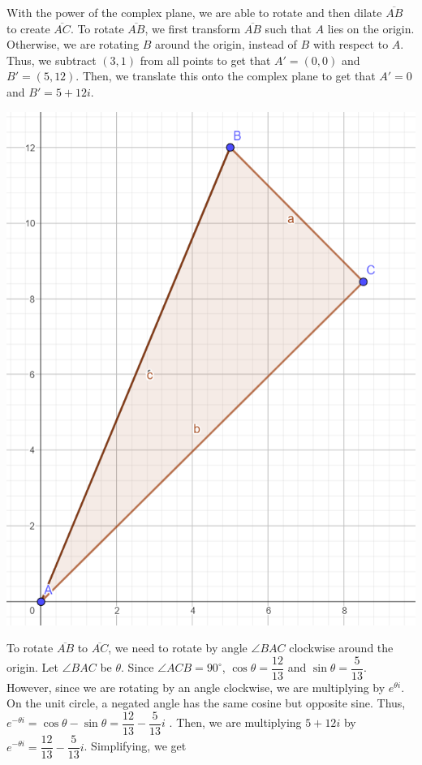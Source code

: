 \documentclass{article}
\begin{document}
With the power of the complex plane, we are able to rotate and then dilate $\overline{AB}$ to create $\overline{AC}$. To rotate $\overline{AB}$, we first transform $\overline{AB}$ such that $A$ lies on the origin. Otherwise, we are rotating $B$ around the origin, instead of $B$ with respect to $A$. Thus, we subtract $(3, 1)$ from all points to get that $A' = (0, 0)$ and $B' = (5, 12)$. Then, we translate this onto the complex plane to get that $A' = 0$ and $B' = 5+12i$. \\ 

\begin{center}
\includegraphics[scale = 0.5]{dec23/images/A3_2.png} \\
\end{center}

To rotate $\overline{AB}$ to $\overline{AC}$, we need to rotate by angle $\angle{BAC}$ clockwise around the origin. Let $\angle{BAC}$ be $\theta$. Since $\angle{ACB} = 90^{\circ}$, $\cos{\theta} = \dfrac{12}{13}$ and $\sin{\theta} = \dfrac{5}{13}$. However, since we are rotating by an angle clockwise, we are multiplying by $e^{\theta i}$. On the unit circle, a negated angle has the same cosine but opposite sine. Thus, $e^{-\theta i} = \cos{\theta} - \sin{\theta} = \dfrac{12}{13} - \dfrac{5}{13}i$ . Then, we are multiplying $5 + 12i$ by $e^{-\theta i} = \dfrac{12}{13} - \dfrac{5}{13}i$. Simplifying, we get
\end{document}
